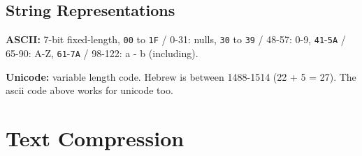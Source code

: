\documentclass[]{article}
\newcommand\ttt   {\texttt}
\newcommand\fortitle[1] {\Large #1 \normalsize}
\begin{document}
\begin{multicols}{2}
		\subsection{String Representations}
		\textbf{ASCII: }7-bit fixed-length, \ttt{00} to \ttt{1F} / 0-31: nulls, \texttt{30} to \texttt{39} / 48-57: 0-9, \texttt{41}-\texttt{5A} / 65-90: A-Z, \texttt{61}-\texttt{7A} / 98-122: a - b (including). 
		
		\textbf{Unicode: }variable length code. Hebrew is between 1488-1514 (22 + 5 = 27). The ascii code above works for unicode too. 
		
	\end{multicols}
	
	\section{\fortitle{Text Compression}}
\end{document}
